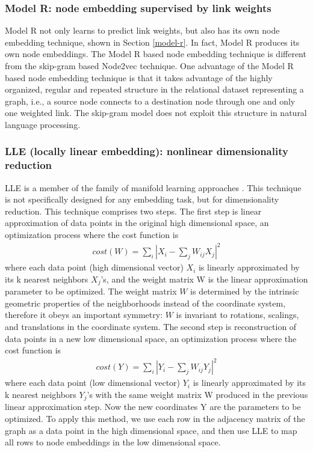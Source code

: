 \documentclass[12pt]{WSUThesis}
\theoremstyle{definition}
\begin{document}
\subsubsection{Model R: node embedding supervised by link weights}
Model R not only learns to predict link weights,
but also has its own node embedding technique, shown in Section \ref{model-r}.
In fact, Model R produces its own node embeddings.
The Model R based node embedding technique is different from the skip-gram based Node2vec technique.
One advantage of the Model R based node embedding technique is that it takes advantage of the highly organized, regular and repeated structure in the relational dataset representing a graph, i.e., a source node connects to a destination node through one and only one weighted link.
The skip-gram model does not exploit this structure in natural language processing.

\subsubsection{LLE (locally linear embedding): nonlinear dimensionality reduction}
LLE is a member of the family of manifold learning approaches \citep{roweis2000nonlinear}.
This technique is not specifically designed for any embedding task, but for dimensionality reduction.
This technique comprises two steps.
The first step is linear approximation of data points in the original high dimensional space, an optimization process where the cost function is
\begin{align*}
cost(W) = \sum_i |X_i - \sum_jW_{ij}X_j|^2
\end{align*}
where each data point (high dimensional vector) $ X_i $ is linearly approximated by its k nearest neighbors $ X_j $'s, and the weight matrix W is the linear approximation parameter to be optimized.
The weight matrix $ W $ is determined by the intrinsic geometric properties of the neighborhoods instead of the coordinate system, therefore it obeys an important symmetry: $ W $ is invariant to rotations, scalings, and translations in the coordinate system.
The second step is reconstruction of data points in a new low dimensional space, an optimization process where the cost function is
\begin{align*}
cost(Y) = \sum_i |Y_i - \sum_jW_{ij}Y_j|^2
\end{align*}
where each data point (low dimensional vector) $ Y_i $ is linearly approximated by its k nearest neighbors $ Y_j $'s with the same weight matrix W produced in the previous linear approximation step. Now the new coordinates Y are the parameters to be optimized.
To apply this method, we use each row in the adjacency matrix of the graph as a data point in the high dimensional space, and then use LLE to map all rows to node embeddings in the low dimensional space.
\end{document}
